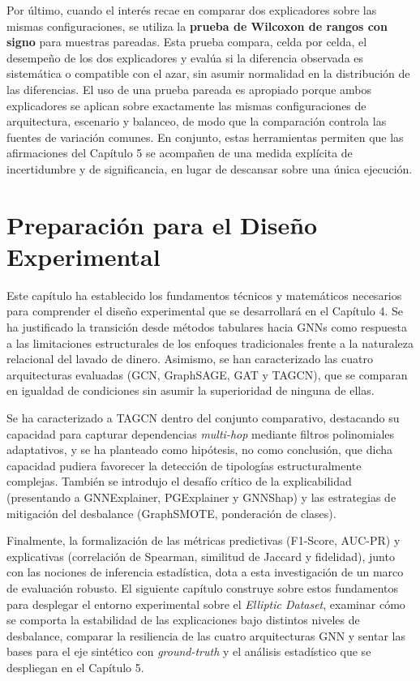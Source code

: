 Por último, cuando el interés recae en comparar dos explicadores sobre las mismas configuraciones, se utiliza la \textbf{prueba de Wilcoxon de rangos con signo} para muestras pareadas. Esta prueba compara, celda por celda, el desempeño de los dos explicadores y evalúa si la diferencia observada es sistemática o compatible con el azar, sin asumir normalidad en la distribución de las diferencias. El uso de una prueba pareada es apropiado porque ambos explicadores se aplican sobre exactamente las mismas configuraciones de arquitectura, escenario y balanceo, de modo que la comparación controla las fuentes de variación comunes. En conjunto, estas herramientas permiten que las afirmaciones del Capítulo 5 se acompañen de una medida explícita de incertidumbre y de significancia, en lugar de descansar sobre una única ejecución.

\section{Preparación para el Diseño Experimental}

Este capítulo ha establecido los fundamentos técnicos y matemáticos necesarios para comprender el diseño experimental que se desarrollará en el Capítulo 4. Se ha justificado la transición desde métodos tabulares hacia GNNs como respuesta a las limitaciones estructurales de los enfoques tradicionales frente a la naturaleza relacional del lavado de dinero. Asimismo, se han caracterizado las cuatro arquitecturas evaluadas (GCN, GraphSAGE, GAT y TAGCN), que se comparan en igualdad de condiciones sin asumir la superioridad de ninguna de ellas.

Se ha caracterizado a TAGCN dentro del conjunto comparativo, destacando su capacidad para capturar dependencias \textit{multi-hop} mediante filtros polinomiales adaptativos, y se ha planteado como hipótesis, no como conclusión, que dicha capacidad pudiera favorecer la detección de tipologías estructuralmente complejas. También se introdujo el desafío crítico de la explicabilidad (presentando a GNNExplainer, PGExplainer y GNNShap) y las estrategias de mitigación del desbalance (GraphSMOTE, ponderación de clases).

Finalmente, la formalización de las métricas predictivas (F1-Score, AUC-PR) y explicativas (correlación de Spearman, similitud de Jaccard y fidelidad), junto con las nociones de inferencia estadística, dota a esta investigación de un marco de evaluación robusto. El siguiente capítulo construye sobre estos fundamentos para desplegar el entorno experimental sobre el \textit{Elliptic Dataset}, examinar cómo se comporta la estabilidad de las explicaciones bajo distintos niveles de desbalance, comparar la resiliencia de las cuatro arquitecturas GNN y sentar las bases para el eje sintético con \textit{ground-truth} y el análisis estadístico que se despliegan en el Capítulo 5.
